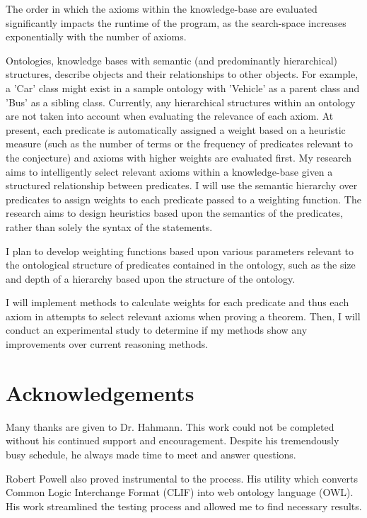 \documentclass{article}
\begin{document}
The order in which the axioms within the knowledge-base are evaluated significantly impacts the runtime of the program, as the search-space increases exponentially with the number of axioms. 

Ontologies, knowledge bases with semantic (and predominantly hierarchical) structures, describe objects and their relationships to other objects. For example, a 'Car' class might exist in a sample ontology with 'Vehicle' as a parent class and 'Bus' as a sibling class. Currently, any hierarchical structures within an ontology are not taken into account when evaluating the relevance of each axiom. At present, each predicate is automatically assigned a weight based on a heuristic measure (such as the number of terms or the frequency of predicates relevant to the conjecture) and axioms with higher weights are evaluated first. My research aims to intelligently select relevant axioms within a knowledge-base given a structured relationship between predicates. I will use the semantic hierarchy over predicates to assign weights to each predicate passed to a weighting function. The research aims to design heuristics based upon the semantics of the predicates, rather than solely the syntax of the statements. 

I plan to develop weighting functions based upon various parameters relevant to the ontological structure of predicates contained in the ontology, such as the size and depth of a hierarchy based upon the structure of the ontology. 

I will implement methods to calculate weights for each predicate and thus each axiom in attempts to select relevant axioms when proving a theorem. Then, I will conduct an experimental study to determine if my methods show any improvements over current reasoning methods.
	
	\setcounter{page}{3}
        \newpage
        \section*{Acknowledgements}
Many thanks are given to Dr. Hahmann. This work could not be completed without his continued support and encouragement. Despite his tremendously busy schedule, he always made time to meet and answer questions. 

Robert Powell also proved instrumental to the process. His utility which converts Common Logic Interchange Format (CLIF) into web ontology language (OWL). His work streamlined the testing process and allowed me to find necessary results. 
\end{document}
